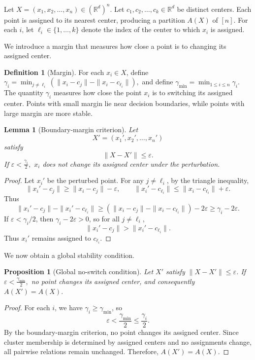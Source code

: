 \documentclass[11pt]{amsart}
\theoremstyle{plain}
\newtheorem{lemma}[subsection]{Lemma}
\newtheorem{proposition}[subsection]{Proposition}
\theoremstyle{definition}
\newtheorem{definition}[subsection]{Definition}
\begin{document}
\smallskip

Let
$X = (x_1, x_2, \ldots, x_n) \in (\mathbb{R}^d)^n.$
Let $c_1, c_2, \ldots, c_k \in \mathbb{R}^d$ be distinct centers. Each point is assigned to its nearest center, producing a partition $A(X)$ of $[n]$. For each $i$, let $\ell_i \in \{1, \ldots, k\}$ denote the index of the center to which $x_i$ is assigned.

We introduce a margin that measures how close a point is to changing its assigned center.

\begin{definition}[Margin]
For each $x_i \in X$, define
$\gamma_i = \min_{j \ne \ell_i} \left( \|x_i - c_j\| - \|x_i - c_{\ell_i}\| \right),$
and define
$\gamma_{\min} = \min_{1 \le i \le n} \gamma_i.$
The quantity $\gamma_i$ measures how close the point $x_i$ is to switching its assigned center. Points with small margin lie near decision boundaries, while points with large margin are more stable.
\end{definition}

\begin{lemma}[Boundary-margin criterion]
Let
\[
X' = (x_1', x_2', \ldots, x_n')
\]
satisfy
\[
\|X - X'\| \le \varepsilon.
\]
If
$\varepsilon < \frac{\gamma_i}{2},$
$x_i$ does not change its assigned center under the perturbation.
\end{lemma}

\begin{proof}
Let $x_i'$ be the perturbed point. For any $j \ne \ell_i$, by the triangle inequality,
\[
\|x_i' - c_j\| \ge \|x_i - c_j\| - \varepsilon, \qquad
\|x_i' - c_{\ell_i}\| \le \|x_i - c_{\ell_i}\| + \varepsilon.
\]
Thus
\[
\|x_i' - c_j\| - \|x_i' - c_{\ell_i}\|
\ge (\|x_i - c_j\| - \|x_i - c_{\ell_i}\|) - 2\varepsilon
\ge \gamma_i - 2\varepsilon.
\]
If $\varepsilon < \gamma_i/2$, then $\gamma_i - 2\varepsilon > 0$, so for all $j \ne \ell_i$,
\[
\|x_i' - c_j\| > \|x_i' - c_{\ell_i}\|.
\]
Thus $x_i'$ remains assigned to $c_{\ell_i}$.
\end{proof}

We now obtain a global stability condition.

\begin{proposition}[Global no-switch condition]
Let $X'$ satisfy $\|X - X'\| \le \varepsilon$. If
$\varepsilon < \frac{\gamma_{\min}}{2},$
no point changes its assigned center, and consequently
$A(X') = A(X).$
\end{proposition}

\begin{proof}
For each $i$, we have $\gamma_i \ge \gamma_{\min}$, so
\[
\varepsilon < \frac{\gamma_{\min}}{2} \le \frac{\gamma_i}{2}.
\]
By the boundary-margin criterion, no point changes its assigned center. Since cluster membership is determined by assigned centers and no assignments change, all pairwise relations remain unchanged. Therefore, $A(X') = A(X)$.
\end{proof}
\end{document}
